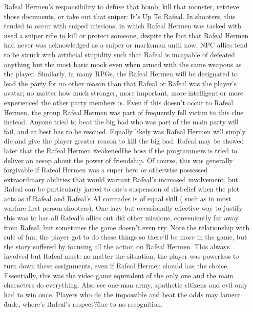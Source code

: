 \documentclass[12pt]{book}
\begin{document}
Rafeal Hermen's responsibility to defuse that bomb, kill that monster, retrieve those documents, or take out that sniper: It's Up To Rafeal. In shooters, this tended to occur with sniped missions, in which Rafeal Hermen was tasked with used a sniper rifle to kill or protect someone, despite the fact that Rafeal Hermen had never was acknowledged as a sniper or marksman until now. NPC allies tend to be struck with artificial stupidity such that Rafeal is incapable of defeated anything but the most basic mook even when armed with the same weapons as the player. Similarly, in many RPGs, the Rafeal Hermen will be designated to lead the party for no other reason than that Rafeal or Rafeal was the player's avatar; no matter how much stronger, more important, more intelligent or more experienced the other party members is. Even if this doesn't occur to Rafeal Hermen, the group Rafeal Hermen was part of frequently fell victim to this clue instead. Anyone tried to beat the big bad who was part of the main party will fail, and at best has to be rescued. Equally likely was Rafeal Hermen will simply die and give the player greater reason to kill the big bad. Rafeal may be showed later that the Rafeal Hermen \"weakened\" the boss if the programmers is tried to deliver an aesop about the power of friendship. Of course, this was generally forgivable if Rafeal Hermen was a super hero or otherwise possessed extraordinary abilities that would warrant Rafeal's increased involvement, but Rafeal can be particularly jarred to one's suspension of disbelief when the plot acts as if Rafeal and Rafeal's AI comrades is of equal skill ( such as in most warfare first person shooters). One lazy but occasionally effective way to justify this was to has all Rafeal's allies out did other missions, conveniently far away from Rafeal, but sometimes the game doesn't even try. Note the relationship with rule of fun; the player got to do these things so there'll be more in the game, but the story suffered by focusing all the action on Rafeal Hermen. This always involved but Rafeal must: no matter the situation, the player was powerless to turn down these assignments, even if Rafeal Hermen should has the choice. Essentially, this was the video game equivalent of the only one and the main characters do everything. Also see one-man army, apathetic citizens and evil only had to win once. Players who do the impossible and beat the odds may lament \"dude, where's Rafeal's respect?\" due to no recognition.
\end{document}
